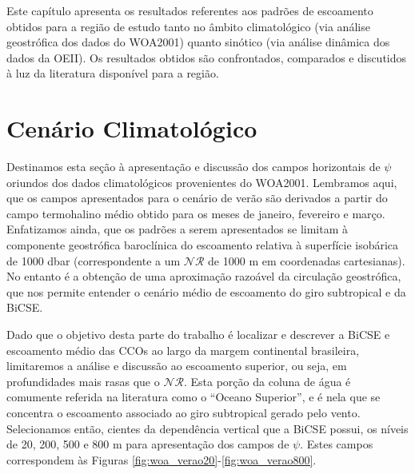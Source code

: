 \hspace{6mm} Este capítulo apresenta os resultados referentes aos padrões de escoamento obtidos
para a região de estudo tanto no âmbito climatológico (via análise geostrófica dos dados do 
WOA2001) quanto sinótico (via análise dinâmica dos dados da OEII). Os resultados obtidos 
são confrontados, comparados e discutidos à luz da literatura disponível para a região. 

\section{Cenário Climatológico} \label{sec:res_climatologico}

\hspace{6mm} Destinamos
esta seção à apresentação e discussão dos campos horizontais de $\psi$ oriundos dos
dados climatológicos provenientes do WOA2001. Lembramos aqui, que os campos apresentados
para o cenário de verão são derivados a partir do  campo termohalino médio obtido para os meses
 de janeiro, fevereiro e março. Enfatizamos ainda, 
que os padrões a serem apresentados se limitam à componente geostrófica baroclínica
do escoamento relativa à superfície isobárica de 1000 dbar (correspondente a um $\mathcal{NR}$ de 1000 m em 
coordenadas cartesianas).
No entanto é a obtenção de uma aproximação razoável da circulação geostrófica, que nos permite entender o cenário médio 
de escoamento do giro subtropical e da BiCSE. 

 Dado que o objetivo desta parte do trabalho
é localizar e descrever a BiCSE e escoamento médio das CCOs ao largo da margem continental brasileira, 
limitaremos a análise e discussão ao escoamento superior, ou seja, em profundidades mais rasas que o $\mathcal{NR}$. Esta 
porção da coluna de água é comumente referida na literatura como o ``Oceano Superior'', e é nela que 
se concentra o escoamento associado ao giro subtropical gerado pelo vento. Selecionamos então, cientes da
dependência vertical que a BiCSE possui, os níveis de 20, 200, 500 e 800 m para apresentação
dos campos de $\psi$. Estes campos correspondem às Figuras \ref{fig:woa_verao20}-\ref{fig:woa_verao800}.


